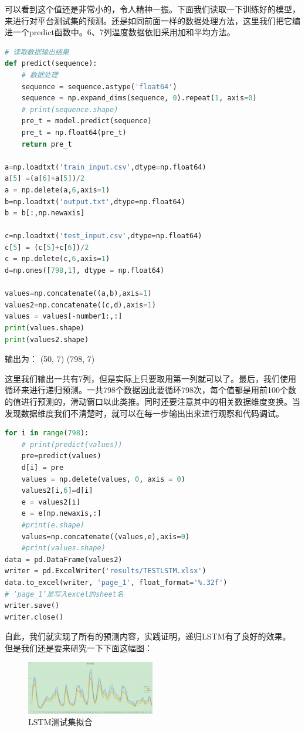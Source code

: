 \documentclass[11pt,a4paper]{elegantpaper}
\begin{document}
\begin{multicols}{2}
可以看到这个值还是非常小的，令人精神一振。下面我们读取一下训练好的模型，来进行对平台测试集的预测。还是如同前面一样的数据处理方法，这里我们把它编进一个predict函数中。6、7列温度数据依旧采用加和平均方法。

\begin{lstlisting}[language=Python]
# 读取数据输出结果
def predict(sequence):
    # 数据处理
    sequence = sequence.astype('float64')
    sequence = np.expand_dims(sequence, 0).repeat(1, axis=0)
    # print(sequence.shape)
    pre_t = model.predict(sequence)
    pre_t = np.float64(pre_t)
    return pre_t

a=np.loadtxt('train_input.csv',dtype=np.float64)
a[5] =(a[6]+a[5])/2
a = np.delete(a,6,axis=1)
b=np.loadtxt('output.txt',dtype=np.float64)
b = b[:,np.newaxis]

c=np.loadtxt('test_input.csv',dtype=np.float64)
c[5] = (c[5]+c[6])/2
c = np.delete(c,6,axis=1)
d=np.ones([798,1], dtype = np.float64)

values=np.concatenate((a,b),axis=1)
values2=np.concatenate((c,d),axis=1)
values = values[-number1:,:]
print(values.shape)
print(values2.shape)
\end{lstlisting}

输出为：
(50, 7) 
(798, 7)

这里我们输出一共有7列，但是实际上只要取用第一列就可以了。最后，我们使用循环来进行递归预测。一共798个数据因此要循环798次，每个值都是用前100个数的值进行预测的，滑动窗口以此类推。同时还要注意其中的相关数据维度变换。当发现数据维度我们不清楚时，就可以在每一步输出出来进行观察和代码调试。

\begin{lstlisting}[language=Python]
for i in range(798):
    # print(predict(values))
    pre=predict(values)
    d[i] = pre
    values = np.delete(values, 0, axis = 0)
    values2[i,6]=d[i]
    e = values2[i]
    e = e[np.newaxis,:]
    #print(e.shape)
    values=np.concatenate((values,e),axis=0)
    #print(values.shape)
data = pd.DataFrame(values2)
writer = pd.ExcelWriter('results/TESTLSTM.xlsx')
data.to_excel(writer, 'page_1', float_format='%.32f')		
# ‘page_1’是写入excel的sheet名
writer.save()
writer.close()
\end{lstlisting}

自此，我们就实现了所有的预测内容，实践证明，递归LSTM有了良好的效果。
但是我们还是要来研究一下下面这幅图：

\begin{figure}[H]
  \centering
  \includegraphics[width=0.5\textwidth]{images/FGNNN.png}
  \caption{LSTM测试集拟合} 
\end{figure}


\end{multicols}
\end{document}
